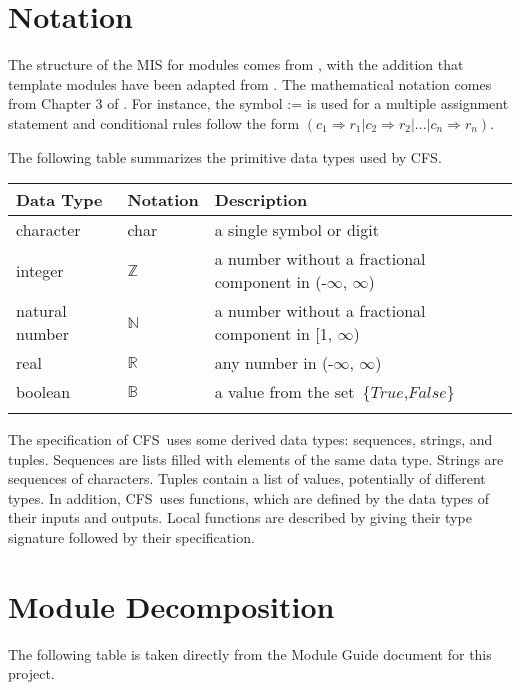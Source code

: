 \documentclass[12pt, titlepage]{article}
\newcommand{\progname}{CFS}
\begin{document}
\section{Notation}

The structure of the MIS for modules comes from \citet{HoffmanAndStrooper1995},
with the addition that template modules have been adapted from
\cite{GhezziEtAl2003}. The mathematical notation comes from Chapter 3 of
\citet{HoffmanAndStrooper1995}.  For instance, the symbol := is used for a
multiple assignment statement and conditional rules follow the form $(c_1
\Rightarrow r_1 | c_2 \Rightarrow r_2 | ... | c_n \Rightarrow r_n )$.



The following table summarizes the primitive data types used by \progname. 

\begin{center}
\renewcommand{\arraystretch}{1.2}
\noindent 
\begin{tabular}{l l p{7.5cm}} 
\toprule 
\textbf{Data Type} & \textbf{Notation} & \textbf{Description}\\ 
\midrule
character & char & a single symbol or digit\\
integer & $\mathbb{Z}$ & a number without a fractional component in (-$\infty$, $\infty$) \\
natural number & $\mathbb{N}$ & a number without a fractional component in [1, $\infty$) \\
real & $\mathbb{R}$ & any number in (-$\infty$, $\infty$)\\

boolean & $\mathbb{B}$ & a value from the set\ \{$True$,$False$\}\\
\bottomrule
\\
\end{tabular} 
\end{center}

\noindent
The specification of \progname \ uses some derived data types: sequences, strings, and
tuples. Sequences are lists filled with elements of the same data type. Strings
are sequences of characters. Tuples contain a list of values, potentially of
different types. In addition, \progname \ uses functions, which
are defined by the data types of their inputs and outputs. Local functions are
described by giving their type signature followed by their specification.

\section{Module Decomposition}
The following table is taken directly from the Module Guide document for this project.
\end{document}
